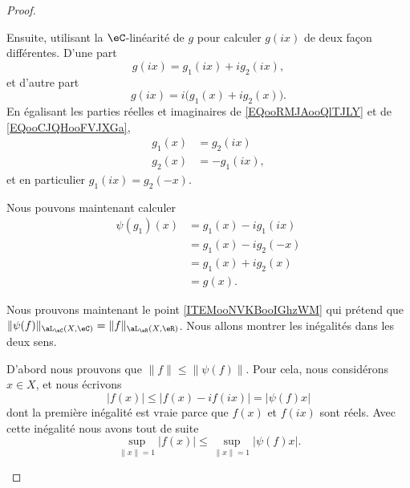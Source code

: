 \begin{proof}
\begin{subproof}
		Ensuite, utilisant la \( \eC\)-linéarité de \( g\) pour calculer \( g(ix)\) de deux façon différentes. D'une part
		\begin{equation}        \label{EQooRMJAooQlTJLY}
			g(ix)=g_1(ix)+ig_2(ix),
		\end{equation}
		et d'autre part
		\begin{equation}        \label{EQooCJQHooFVJXGa}
			g(ix)=i\big( g_1(x)+ig_2(x) \big).
		\end{equation}
		En égalisant les parties réelles et imaginaires de \eqref{EQooRMJAooQlTJLY} et de \eqref{EQooCJQHooFVJXGa},
		\begin{subequations}
			\begin{align}
				g_1(x) & =g_2(ix)   \\
				g_2(x) & =-g_1(ix),
			\end{align}
		\end{subequations}
		et en particulier \( g_1(ix)=g_2(-x)\).

		Nous pouvons maintenant calculer
		\begin{subequations}
			\begin{align}
				\psi(g_1)(x) & =g_1(x)-ig_1(ix) \\
				             & =g_1(x)-ig_2(-x) \\
				             & =g_1(x)+ig_2(x)  \\
				             & =g(x).
			\end{align}
		\end{subequations}

		\spitem[Norme]
		Nous prouvons maintenant le point \ref{ITEMooNVKBooIGhzWM} qui prétend que \( \| \psi(f) \|_{\aL_{\eC}(X,\eC)}=\| f \|_{\aL_{\eR}(X,\eR)}\). Nous allons montrer les inégalités dans les deux sens.

		\begin{subproof}

			D'abord nous prouvons que \( \| f \|\leq \| \psi(f) \|\). Pour cela, nous considérons \( x\in X\), et nous écrivons
			\begin{equation}
				| f(x) |\leq | f(x)-if(ix) |=| \psi(f)x |
			\end{equation}
			dont la première inégalité est vraie parce que \( f(x)\) et \( f(ix)\) sont réels. Avec cette inégalité nous avons tout de suite
			\begin{equation}
				\sup_{\| x \|=1}| f(x) |\leq \sup_{\| x \|=1}| \psi(f)x |.
			\end{equation}


\end{subproof}
\end{subproof}
\end{proof}
